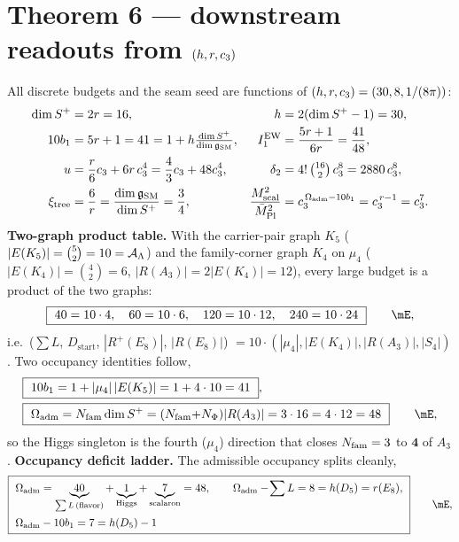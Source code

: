 \section*{Theorem 6 --- downstream readouts from $(h,r,c_3)$}
All discrete budgets and the seam seed are functions of $(h,r,c_3)=(30,8,1/(8\pi))$:
\begin{align}
  \dim S^+&=2r=16, & h&=2(\dim S^+-1)=30, \\
  10b_1&=5r+1=41=1+h\tfrac{\dim S^+}{\dim\mathfrak g_{\mathrm{SM}}}, & I_1^{\mathrm{EW}}&=\frac{5r+1}{6r}=\frac{41}{48}, \\
  u&=\frac{r}{6}c_3+6r\,c_3^4=\frac43c_3+48c_3^4, &
  \delta_2&=4!\,\tbinom{16}{2}\,c_3^8=2880\,c_3^8, \\
  \xi_{\mathrm{tree}}&=\frac{6}{r}=\frac{\dim\mathfrak g_{\mathrm{SM}}}{\dim S^+}=\frac34, &
  \frac{M_{\mathrm{scal}}^2}{\bar M_{\mathrm{Pl}}^2}&=c_3^{\,\Omega_{\mathrm{adm}}-10b_1}=c_3^{\,r-1}=c_3^7 .
\end{align}
\textbf{Two-graph product table.} With the carrier-pair graph $K_5$ ($|E(K_5)|=\binom52=10=\mathcal A_\Lambda$) and
the family-corner graph $K_4$ on $\mu_4$ ($|E(K_4)|=\binom42=6$, $|R(A_3)|=2|E(K_4)|=12$), every large
budget is a product of the two graphs:
\begin{equation}
  \boxed{\ 40=10\cdot4,\quad 60=10\cdot6,\quad 120=10\cdot12,\quad 240=10\cdot24\ }\qquad\mE ,
\end{equation}
i.e.\ ($\sum L$, $D_{\mathrm{start}}$, $|R^+(E_8)|$, $|R(E_8)|$) $=10\cdot(|\mu_4|,|E(K_4)|,|R(A_3)|,|S_4|)$.
Two occupancy identities follow,
\begin{equation}
\begin{aligned}
  &\boxed{\ 10b_1=1+|\mu_4|\,|E(K_5)|=1+4\cdot10=41\ },\\
  &\boxed{\ \Oadm=\Nfam\dim S^+=(\Nfam{+}N_\Phi)|R(A_3)|=3\cdot16=4\cdot12=48\ }\qquad\mE ,
\end{aligned}
\end{equation}
so the Higgs singleton is the fourth ($\mu_4$) direction that closes $N_{\mathrm{fam}}=3$ to $\mathbf 4$ of $A_3$.
\textbf{Occupancy deficit ladder.} The admissible occupancy splits cleanly,
\begin{equation}
  \boxed{\ \begin{aligned}
    &\Oadm=\underbrace{40}_{\sum L\,(\text{flavor})}+\underbrace{1}_{\text{Higgs}}+\underbrace{7}_{\text{scalaron}}=48,\qquad
    \Oadm-\!\sum L=8=h(D_5)=r(E_8),\\
    &\Oadm-10b_1=7=h(D_5)-1
  \end{aligned}\ }\qquad\mE ,
\end{equation}
